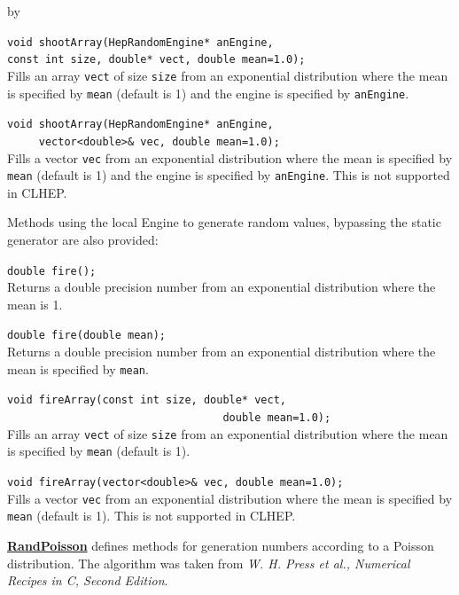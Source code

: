 \documentclass[twoside]{article}
\newcommand{\comp}[1]{\texttt{#1}}%
\newcommand{\entrylabel}[1]{\mbox{\textbf{{#1}}}\hfil}%
\newenvironment{entry}
{\begin{list}{}%
    {\renewcommand{\makelabel}{\entrylabel}%
     \setlength{\labelwidth}{90pt}%
     \setlength{\leftmargin}{\labelwidth}
     \advance\leftmargin by \labelsep%
      }%
    }%
  {\end{list}}
\newcommand{\Entrylabel}[1]%
{\raisebox{0pt}[1ex][0pt]{\makebox[\labelwidth][l]%
    {\parbox[t]{\labelwidth}{\hspace{0pt}\textbf{{#1}}}}}}
\newenvironment{Entry}%
{\renewcommand{\entrylabel}{\Entrylabel}\begin{entry}}%
  {\end{entry}}
\begin{document}
\begin{Entry}
   \verb+void shootArray(HepRandomEngine* anEngine,+\\
   \verb+const int size, double* vect, double mean=1.0);+\\
   Fills an array \comp{vect} of size \comp{size} from an exponential distribution
   where the mean is specified by \comp{mean} (default is 1) and
   the engine is specified by \comp{anEngine}.

   \verb+void shootArray(HepRandomEngine* anEngine,+\\
   \verb+     vector<double>& vec, double mean=1.0);+\\
   Fills a vector \comp{vec} from an exponential distribution
   where the mean is specified by \comp{mean} (default is 1) and
   the engine is specified by \comp{anEngine}.  This is not supported
   in CLHEP.
   
   Methods using the local Engine to generate random values, bypassing
   the static generator are also provided:

   \verb+double fire();+\\
   Returns a double precision number from an exponential distribution where the
   mean is 1.
  
   \verb+double fire(double mean);+\\
   Returns a double precision number from an exponential distribution where the
   mean is specified by \comp{mean}.

   \verb+void fireArray(const int size, double* vect,+\\
   \verb+                                  double mean=1.0);+\\
   Fills an array \comp{vect} of size \comp{size} from an exponential distribution
   where the mean is specified by \comp{mean} (default is 1).

   \verb+void fireArray(vector<double>& vec, double mean=1.0);+\\
   Fills a vector \comp{vec} from an exponential distribution
   where the mean is specified by \comp{mean} (default is 1).
   This is not supported in CLHEP.

   \begin{description}
     \item \underline{\bf RandPoisson}  defines methods for generation numbers
       according to a Poisson distribution.  The algorithm was taken
       from {\em W. H. Press et al., Numerical Recipes in C, Second Edition}.
   \end{description}
   

\end{Entry}
\end{document}

